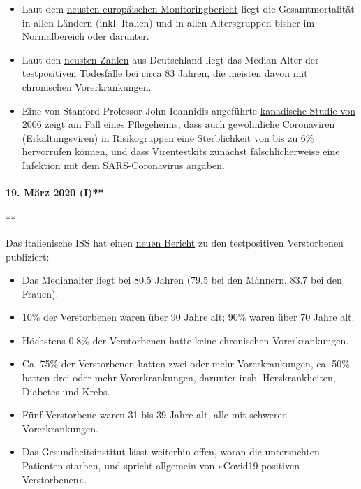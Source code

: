 \begin{itemize}
\tightlist
\item
  Laut dem \href{https://www.euromomo.eu/index.html}{neusten
  europäischen Monitoringbericht} liegt die Gesamtmortalität in allen
  Ländern (inkl. Italien) und in allen Altersgruppen bisher im
  Normalbereich oder darunter.
\item
  Laut den
  \href{https://de.wikipedia.org/wiki/COVID-19-Pandemie_in_Deutschland\#Todesf\%C3\%A4lle_in_den_Medien}{neusten
  Zahlen} aus Deutschland liegt das Median-Alter der testpositiven
  Todesfälle bei circa 83 Jahren, die meisten davon mit chronischen
  Vorerkrankungen.
\item
  Eine von Stanford-Professor John Ioannidis angeführte
  \href{https://www.ncbi.nlm.nih.gov/pmc/articles/PMC2095096/}{kanadische
  Studie von 2006} zeigt am Fall eines Pflegeheims, dass auch
  gewöhnliche Coronaviren (Erkältungsviren) in Risikogruppen eine
  Sterblichkeit von bis zu 6\% hervorrufen können, und dass
  Virentestkits zunächst fälschlicherweise eine Infektion mit dem
  SARS-Coronavirus angaben.
\end{itemize}

\hypertarget{19-muxe4rz-2020-i}{%
\paragraph{19. März 2020 (I)**}\label{19-muxe4rz-2020-i}}

**

Das italienische ISS hat einen
\href{https://www.epicentro.iss.it/coronavirus/bollettino/Report-COVID-2019_17_marzo-v2.pdf}{neuen
Bericht} zu den testpositiven Verstorbenen publiziert:

\begin{itemize}
\tightlist
\item
  Das Medianalter liegt bei 80.5 Jahren (79.5 bei den Männern, 83.7 bei
  den Frauen).
\item
  10\% der Verstorbenen waren über 90 Jahre alt; 90\% waren über 70
  Jahre alt.
\item
  Höchstens 0.8\% der Verstorbenen hatte keine chronischen
  Vorerkrankungen.
\item
  Ca. 75\% der Verstorbenen hatten zwei oder mehr Vorerkrankungen, ca.
  50\% hatten drei oder mehr Vorerkrankungen, darunter insb.
  Herzkrankheiten, Diabetes und Krebs.
\item
  Fünf Verstorbene waren 31 bis 39 Jahre alt, alle mit schweren
  Vorerkrankungen.
\item
  Das Gesundheitsinstitut lässt weiterhin offen, woran die untersuchten
  Patienten starben, und spricht allgemein von »Covid19-positiven
  Verstorbenen«.
\end{itemize}

